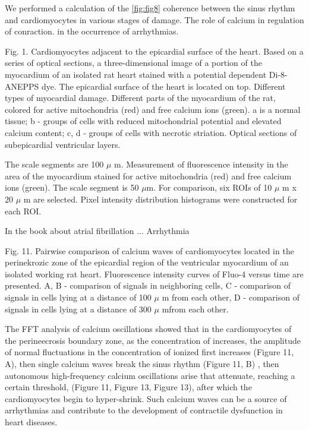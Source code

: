 \documentclass{biophys-new}
\begin{document}
We performed a calculation of the \ref{fig:fig8} coherence between the sinus rhythm and cardiomyocytes in various stages of damage.
The role of calcium in regulation of conraction.
in the occurrence of arrhythmias.


Fig. 1. Cardiomyocytes adjacent to the epicardial surface of the heart.
Based on a series of optical sections, a three-dimensional image of a portion of the myocardium of an isolated rat heart stained with a potential dependent Di-8-ANEPPS dye.
The epicardial surface of the heart is located on top.
Different types of myocardial damage.
Different parts of the myocardium of the rat, colored for active mitochondria (red) and free calcium ions (green). a is a normal tissue; b - groups of cells with reduced mitochondrial potential and elevated calcium content; c, d - groups of cells with necrotic striation. Optical sections of subepicardial ventricular layers.


The scale segments are 100 $\mu$ m.
Measurement of fluorescence intensity in the area of the myocardium stained for active mitochondria (red) and free calcium ions (green).
The scale segment is 50 $\mu$m.
For comparison, six ROIs of 10 $\mu$ m x 20 $\mu$ m are selected.
Pixel intensity distribution histograms were constructed for each ROI.


In the book \cite{kockskamper2002subcellular} about atrial fibrillation ...
Arrhythmia


Fig. 11. Pairwise comparison of calcium waves of cardiomyocytes located in the perinekrozic zone of the epicardial region of the ventricular myocardium of an isolated working rat heart. Fluorescence intensity curves of Fluo-4 versus time are presented. A, B - comparison of signals in neighboring cells, C - comparison of signals in cells lying at a distance of 100 $\mu$ m from each other, D - comparison of signals in cells lying at a distance of 300 $\mu$  mfrom each other.


The FFT analysis of calcium oscillations showed that in the cardiomyocytes of the perineecrosis boundary zone, as the concentration of  increases, the amplitude of normal fluctuations in the concentration of ionized  first increases (Figure 11, A), then single calcium waves break the sinus rhythm (Figure 11, B) , then autonomous high-frequency calcium oscillations arise that attenuate, reaching a certain threshold, (Figure 11, Figure 13, Figure 13), after which the cardiomyocytes begin to hyper-shrink. Such calcium waves can be a source of arrhythmias and contribute to the development of contractile dysfunction in heart diseases.
\end{document}
